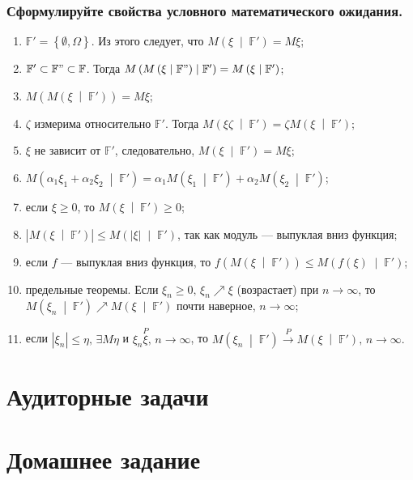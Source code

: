 \subsubsection*{Сформулируйте свойства условного математического ожидания.}

\begin{enumerate}
  \item $ \mathbb{F'} = \left\{ \emptyset, \Omega \right\} $.
  Из этого следует, что $M \left( \xi \; \middle| \; \mathbb{F'} \right) = M \xi $;
  \item $ \mathbb{F'} \subset \mathbb{F"} \subset \mathbb{F}$.
  Тогда
  $M \left( M \left( \xi \; \middle| \; \mathbb{F"} \right) \; \middle| \; \mathbb{F'} \right) =
    M \left( \xi \; \middle| \; \mathbb{F'} \right) $;
  \item $M \left( M \left( \xi \; \middle| \; \mathbb{F'} \right) \right) = M \xi $;
  \item $ \zeta $ измерима относительно $ \mathbb{F'}$.
  Тогда
  $M \left( \xi \zeta \; \middle| \; \mathbb{F'} \right) =
    \zeta M \left( \xi \; \middle| \; \mathbb{F'} \right) $;
  \item $ \xi $ не зависит от $ \mathbb{F'}$, следовательно,
  $M \left( \xi \; \middle| \; \mathbb{F'} \right) =
    M \xi $;
  \item $M \left( \alpha_1 \xi_1 + \alpha_2 \xi_2 \; \middle| \; \mathbb{F'} \right) =
    \alpha_1 M \left( \xi_1 \; \middle| \; \mathbb{F'} \right) +
    \alpha_2 M \left( \xi_2 \; \middle| \; \mathbb{F'} \right) $;
  \item если $ \xi \geq 0$, то $M \left( \xi \; \middle| \; \mathbb{F'} \right) \geq 0$;
  \item $ \left| M \left( \xi \; \middle| \; \mathbb{F'} \right) \right| \leq
    M \left( \left| \xi \right| \; \middle| \; \mathbb{F'} \right) $,
  так как модуль --- выпуклая вниз функция;
  \item если $f$ --- выпуклая вниз функция,
  то $f \left( M \left( \xi \; \middle| \; \mathbb{F'} \right) \right) \leq
    M \left( f \left( \xi \right) \; \middle| \; \mathbb{F'} \right) $;
  \item предельные теоремы.
  Если $ \xi_n \geq 0, \, \xi_n \nearrow \xi $ (возрастает) при $n \to \infty $,
  то
  $M \left( \xi_n \; \middle| \; \mathbb{F'} \right) \nearrow
    M \left( \xi \; \middle| \; \mathbb{F'} \right) $
  почти наверное, $n \to \infty $;
  \item если $ \left| \xi_n \right| \leq \eta, \, \exists M \eta $ и
  $ \xi_n \overset{P} \xi, \, n \to \infty $,
  то
  $M \left( \xi_n \; \middle| \; \mathbb{F'} \right) \overset{P}{ \to }
    M \left( \xi \; \middle| \; \mathbb{F'} \right), \,
    n \to \infty.$
\end{enumerate}

\section*{Аудиторные задачи}


\section*{Домашнее задание}
